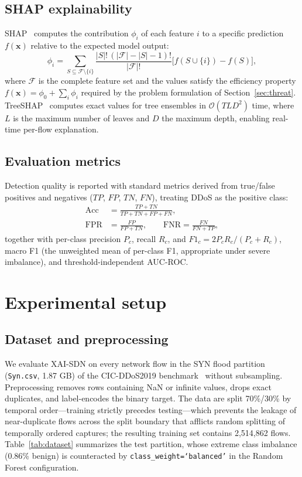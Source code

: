 ﻿\documentclass[journal]{IEEEtran}
\begin{document}
\subsection{SHAP explainability}
SHAP~\cite{lundberg2017shap} computes the contribution $\phi_i$ of each feature $i$ to a specific prediction $f(\mathbf{x})$ relative to the expected model output:
\begin{equation}
\phi_i = \sum_{S \subseteq \mathcal{F} \setminus \{i\}} \frac{|S|!\,(|\mathcal{F}|-|S|-1)!}{|\mathcal{F}|!} \bigl[f(S \cup \{i\}) - f(S)\bigr],
\label{eq:shap}
\end{equation}
where $\mathcal{F}$ is the complete feature set and the values satisfy the efficiency property $f(\mathbf{x}) = \phi_0 + \sum_{i} \phi_i$ required by the problem formulation of Section~\ref{sec:threat}. TreeSHAP~\cite{lundberg2020treeshap} computes exact values for tree ensembles in $\mathcal{O}(TLD^2)$ time, where $L$ is the maximum number of leaves and $D$ the maximum depth, enabling real-time per-flow explanation.

\subsection{Evaluation metrics}
Detection quality is reported with standard metrics derived from true/false positives and negatives ($TP$, $FP$, $TN$, $FN$), treating DDoS as the positive class:
\begin{equation}
\begin{aligned}
\mathrm{Acc} &= \tfrac{TP+TN}{TP+TN+FP+FN}, \\
\mathrm{FPR} &= \tfrac{FP}{FP+TN}, \qquad \mathrm{FNR} = \tfrac{FN}{FN+TP},
\end{aligned}
\label{eq:metrics}
\end{equation}
together with per-class precision $P_c$, recall $R_c$, and $F1_c = 2P_cR_c/(P_c+R_c)$, macro F1 (the unweighted mean of per-class F1, appropriate under severe imbalance), and threshold-independent AUC-ROC.

\section{Experimental setup}
\label{sec:setup}

\subsection{Dataset and preprocessing}
We evaluate XAI-SDN on every network flow in the SYN flood partition (\texttt{Syn.csv}, 1.87 GB) of the CIC-DDoS2019 benchmark~\cite{sharafaldin2019ddos} without subsampling. Preprocessing removes rows containing NaN or infinite values, drops exact duplicates, and label-encodes the binary target. The data are split 70\%/30\% by temporal order---training strictly precedes testing---which prevents the leakage of near-duplicate flows across the split boundary that afflicts random splitting of temporally ordered captures; the resulting training set contains 2,514,862 flows. Table~\ref{tab:dataset} summarizes the test partition, whose extreme class imbalance (0.86\% benign) is counteracted by \texttt{class\_weight=`balanced'} in the Random Forest configuration.
\end{document}
